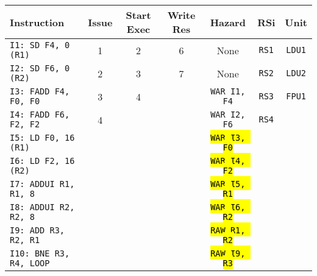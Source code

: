 \begin{enumerate}
    \begin{table}[!htp]
        \centering
        \begin{adjustbox}{width={\textwidth},totalheight={\textheight},keepaspectratio}
        \begin{tabular}{@{} l c c c c c c @{}}
            \toprule
            \textbf{Instruction} & \textbf{Issue} & \textbf{Start Exec} & \textbf{Write Res} & \textbf{Hazard} & \textbf{RSi} & \textbf{Unit} \\
            \midrule
            \texttt{I1: SD F4, 0 (R1)}      & 1 & 2 & 6 & None  & \texttt{RS1}   & \texttt{LDU1}  \\ [.5em]
            \texttt{I2: SD F6, 0 (R2)}      & 2 & 3 & 7 & None  & \texttt{RS2}   & \texttt{LDU2}  \\ [.5em]
            \texttt{I3: FADD F4, F0, F0}    & 3 & 4 &   & \texttt{WAR I1, F4}  & \texttt{RS3} & \texttt{FPU1} \\ [.5em]
            \texttt{I4: FADD F6, F2, F2}    & 4 &   &   & \texttt{WAR I2, F6} & \texttt{RS4} &       \\ [.5em]
            \texttt{I5: LD F0, 16 (R1)}     &   &   &   & \hl{\texttt{WAR I3, F0}} &       &       \\ [.5em]
            \texttt{I6: LD F2, 16 (R2)}     &   &   &   & \hl{\texttt{WAR I4, F2}} &       &       \\ [.5em]
            \texttt{I7: ADDUI R1, R1, 8}    &   &   &   & \hl{\texttt{WAR I5, R1}} &       &       \\ [.5em]
            \texttt{I8: ADDUI R2, R2, 8}    &   &   &   & \hl{\texttt{WAR I6, R2}} &       &       \\ [.5em]
            \texttt{I9: ADD R3, R2, R1}     &   &   &   & \hl{\texttt{RAW R1, R2}} &       &       \\ [.5em]
            \texttt{I10: BNE R3, R4, LOOP}   &   &   &   & \hl{\texttt{RAW I9, R3}} &       &       \\
            \bottomrule
        \end{tabular}
        \end{adjustbox}
    \end{table}
    

\end{enumerate}
